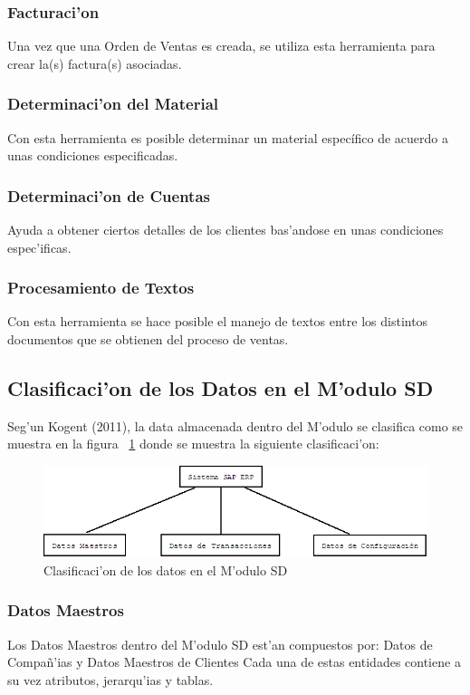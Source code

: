 \subsubsection{Facturaci'on}
Una vez que una Orden de Ventas es creada, se utiliza esta herramienta para crear la(s) factura(s) asociadas.
\subsubsection{Determinaci'on del Material}
Con esta herramienta es posible determinar un material específico de acuerdo a unas condiciones especificadas.
\subsubsection{Determinaci'on de Cuentas}
Ayuda a obtener ciertos detalles de los clientes bas'andose en unas condiciones espec'ificas.
\subsubsection{Procesamiento de Textos}
Con esta herramienta se hace posible el manejo de textos entre los distintos documentos que se obtienen del proceso de ventas.


\subsection{Clasificaci'on de los Datos en el M'odulo SD}
Seg'un Kogent (2011), la data almacenada dentro del M'odulo se clasifica como se muestra en la figura ~\ref{fig:datasd} donde se muestra la siguiente clasificaci'on:
\begin{figure}[H]
\centering
\includegraphics[scale=0.70,type=png,ext=.png,read=.png]{figures/Clasificacion1}
\caption{Clasificaci'on de los datos en el M'odulo SD}
\label{fig:datasd}
\end{figure}
\subsubsection*{Datos Maestros}
Los Datos Maestros dentro del M'odulo SD est'an compuestos por: Datos de Compa\~n'ias y Datos Maestros de Clientes
Cada una de estas entidades contiene a su vez atributos, jerarqu'ias y tablas.

